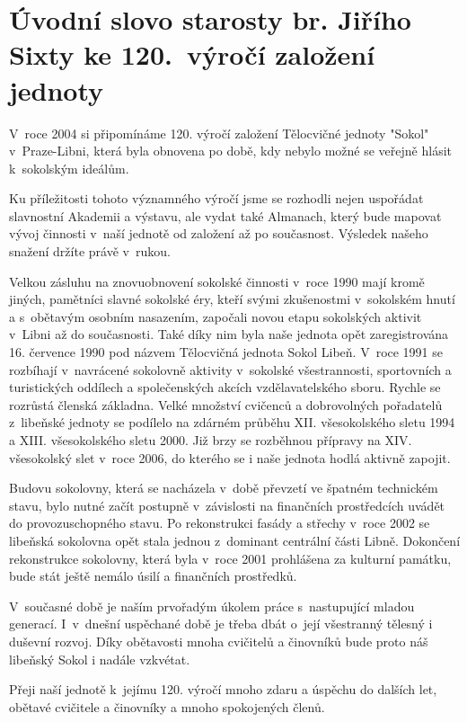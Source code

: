 \documentclass[a5paper, 12pt, twoside]{article}
\begin{document}
\section{Úvodní slovo starosty br. Jiřího Sixty ke 120.~výročí založení jednoty}

V~roce 2004 si připomínáme 120. výročí založení Tělocvičné jednoty "Sokol" v~Praze-Libni, která byla obnovena po době, kdy nebylo možné se veřejně hlásit k~sokolským ideálům.

Ku příležitosti tohoto významného výročí jsme se rozhodli nejen uspořádat slavnostní Akademii a výstavu, ale vydat také Almanach, který bude mapovat vývoj činnosti v~naší jednotě od založení až po současnost. Výsledek našeho snažení držíte právě v~rukou.

Velkou zásluhu na znovuobnovení sokolské činnosti v~roce 1990 mají kromě jiných, pamětníci slavné sokolské éry, kteří svými zkušenostmi v~sokolském hnutí a s~obětavým osobním nasazením, započali novou etapu sokolských aktivit v~Libni až do současnosti. Také díky nim byla naše jednota opět zaregistrována 16. července 1990 pod názvem Tělocvičná jednota Sokol Libeň. V~roce 1991 se rozbíhají v~navrácené sokolovně aktivity v~sokolské všestrannosti, sportovních a turistických oddílech a společenských akcích vzdělavatelského sboru. Rychle se rozrůstá členská základna. Velké množství cvičenců a dobrovolných pořadatelů z~libeňské jednoty se podílelo na zdárném průběhu XII. všesokolského sletu 1994 a XIII. všesokolského sletu 2000. Již brzy se rozběhnou přípravy na XIV. všesokolský slet v~roce 2006, do kterého se i naše jednota hodlá aktivně zapojit.

Budovu sokolovny, která se nacházela v~době převzetí ve špatném technickém stavu, bylo nutné začít postupně v~závislosti na finančních prostředcích uvádět do provozuschopného stavu. Po rekonstrukci fasády a střechy v~roce 2002 se libeňská sokolovna opět stala jednou z~dominant centrální části Libně. Dokončení rekonstrukce sokolovny, která byla v~roce 2001 prohlášena za kulturní památku, bude stát ještě nemálo úsilí a finančních prostředků.

V~současné době je naším prvořadým úkolem práce s~nastupující mladou generací. I~v~dnešní uspěchané době je třeba dbát o~její všestranný tělesný i duševní rozvoj. Díky obětavosti mnoha cvičitelů a činovníků bude proto náš libeňský Sokol i nadále vzkvétat.

Přeji naší jednotě k~jejímu 120. výročí mnoho zdaru a úspěchu do dalších let, obětavé cvičitele a činovníky a mnoho spokojených členů.
\end{document}
